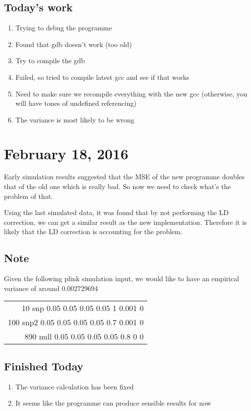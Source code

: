 \documentclass[12pt]{article}
\begin{document}
	\subsection{Today's work}
	\begin{enumerate}
		\item Trying to debug the programme
		\item Found that gdb doesn't work (too old)
		\item Try to compile the gdb
		\item Failed, so tried to compile latest gcc and see if that works
		\item Need to make sure we recompile everything with the new gcc (otherwise, you will have tones of undefined referencing)
		\item The variance is most likely to be wrong
	\end{enumerate}
	\section{February 18, 2016}
	Early simulation results suggested that the MSE of the new programme doubles that of the old one which is really bad. 
	So now we need to check what's the problem of that.
	
	Using the last simulated data, it was found that by not performing the LD correction, we can get a similar result as the new implementation. 
	Therefore it is likely that the LD correction is accounting for the problem.
	
	\subsection{Note}
	Given the following plink simulation input, we would like to have an empirical variance of around 0.002729694
	
	
	\begin{tabular}{r}
		10 snp  0.05 0.05 0.05 0.05 1 0.001 0\\
		100 snp2 0.05 0.05 0.05 0.05 0.7 0.001 0\\
		890 null 0.05 0.05 0.05 0.05 0.8 0 0\\
	\end{tabular}
	
	\subsection{Finished Today}
	\begin{enumerate}
		\item The variance calculation has been fixed
		\item It seems like the programme can produce sensible results for now
	\end{enumerate}
\end{document}
